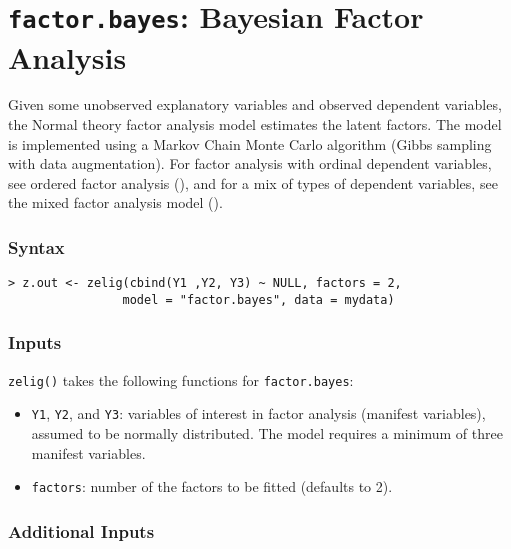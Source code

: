 \section{\texttt{factor.bayes}: Bayesian Factor Analysis}
\label{factor.bayes}

Given some unobserved explanatory variables and observed dependent
variables, the Normal theory factor analysis model estimates the
latent factors.  The model is implemented using a Markov Chain Monte
Carlo algorithm (Gibbs sampling with data augmentation).  For factor
analysis with ordinal dependent variables, see ordered factor analysis
(), and for a mix of types of dependent variables,
see the mixed factor analysis model ().

\subsubsection{Syntax}
\begin{verbatim}
> z.out <- zelig(cbind(Y1 ,Y2, Y3) ~ NULL, factors = 2, 
                model = "factor.bayes", data = mydata)
\end{verbatim}

\subsubsection{Inputs}
{\tt zelig()} takes the following functions for {\tt factor.bayes}:  
\begin{itemize}
\item \texttt{Y1}, {\tt Y2}, and \texttt{Y3}: variables of interest in 
factor analysis (manifest variables), assumed to be normally
distributed. The model requires a minimum of three manifest variables.

\item \texttt{factors}: number of the factors to be fitted (defaults to 2).

\end{itemize}

\subsubsection{Additional Inputs}

